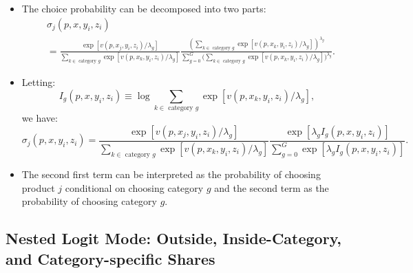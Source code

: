 \documentclass[
]{book}
\providecommand{\tightlist}{%
  \setlength{\itemsep}{0pt}\setlength{\parskip}{0pt}}
\begin{document}
\begin{itemize}
\tightlist
\item
  The choice probability can be decomposed into two parts:
  \begin{equation}
  \begin{split}
  &\sigma_{j}(p, x, y_i, z_i)\\
  &= \frac{\exp[v(p, x_j, y_i, z_i)/\lambda_g]}{\sum_{k \in \text{   category   } g} \exp[v(p, x_k, y_i, z_i)/\lambda_g]} \frac{\left(\sum_{k \in \text{   category   } g} \exp[v(p, x_k, y_i, z_i)/\lambda_g]\right)^{\lambda_g}}{\sum_{g = 0}^G \Bigg(\sum_{k \in \text{   category   } g} \exp[v(p, x_k, y_i, z_i)/\lambda_g]\Bigg)^{\lambda_g}}.
  \end{split}
  \end{equation}
\item
  Letting:
  \[
  I_{g}(p, x, y_i, z_i) \equiv \log \sum_{k \in \text{   category   } g} \exp[v(p, x_k, y_i, z_i)/\lambda_g],
  \]
  we have:
  \begin{equation}
  \sigma_{j}(p, x, y_i, z_i) = \frac{\exp[v(p, x_j, y_i, z_i)/\lambda_g]}{\sum_{k \in \text{   category   } g} \exp[v(p, x_k, y_i, z_i)/\lambda_g]} \frac{\exp[\lambda_g I_{g}(p, x, y_i, z_i)]}{\sum_{g = 0}^G \exp[\lambda_g I_{g}(p, x, y_i, z_i)]}.
  \end{equation}
\item
  The second first term can be interpreted as the probability of choosing product \(j\) conditional on choosing category \(g\) and the second term as the probability of choosing category \(g\).
\end{itemize}

\hypertarget{nested-logit-mode-outside-inside-category-and-category-specific-shares}{%
\subsection{Nested Logit Mode: Outside, Inside-Category, and Category-specific Shares}\label{nested-logit-mode-outside-inside-category-and-category-specific-shares}}
\end{document}
